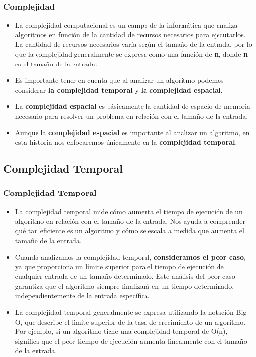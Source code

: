 \documentclass[xcolor=table]{beamer}
\begin{document}
\begin{frame}  \frametitle{Complejidad}\small

\begin{itemize}
    \item La complejidad computacional es un campo de la informática que analiza algoritmos en función de la cantidad de recursos necesarios para ejecutarlos. La cantidad de recursos necesarios varía según el tamaño de la entrada, por lo que la complejidad generalmente se expresa como una función de \textbf{n}, donde \textbf{n} es el tamaño de la entrada.

    \item Es importante tener en cuenta que al analizar un algoritmo podemos considerar\textbf{ la complejidad temporal} y \textbf{la complejidad espacial}. 

    \item La \textbf{complejidad espacial} es básicamente la cantidad de espacio de memoria necesario para resolver un problema en relación con el tamaño de la entrada. 

    \item Aunque la \textbf{complejidad espacial} es importante al analizar un algoritmo, en esta historia nos enfocaremos únicamente en la \textbf{complejidad temporal}.
\end{itemize}
\end{frame} 

\subsection{Complejidad Temporal}
\begin{frame}  \frametitle{Complejidad Temporal} \small  

\begin{itemize}
    \item La complejidad temporal mide cómo aumenta el tiempo de ejecución de un algoritmo en relación con el tamaño de la entrada. Nos ayuda a comprender qué tan eficiente es un algoritmo y cómo se escala a medida que aumenta el tamaño de la entrada.

\item Cuando analizamos la complejidad temporal, \textbf{consideramos el peor caso}, ya que proporciona un límite superior para el tiempo de ejecución de cualquier entrada de un tamaño determinado. Este análisis del peor caso garantiza que el algoritmo siempre finalizará en un tiempo determinado, independientemente de la entrada específica.

\item La complejidad temporal generalmente se expresa utilizando la notación Big O, que describe el límite superior de la tasa de crecimiento de un algoritmo. Por ejemplo, si un algoritmo tiene una complejidad temporal de O(n), significa que el peor tiempo de ejecución aumenta linealmente con el tamaño de la entrada.
\end{itemize}

\end{frame} 
\end{document}
